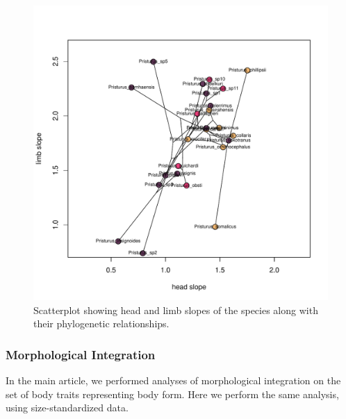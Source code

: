 \documentclass[
  11pt,
]{article}
\begin{document}
\begin{figure}[H]

{\centering \includegraphics[width=1\linewidth]{Figs/scatterplot_slopes} 

}

\caption{Scatterplot showing head and limb slopes of the species along with their phylogenetic relationships.}\label{fig:unnamed-chunk-7}
\end{figure}

\newpage

\hypertarget{morphological-integration}{%
\subsubsection{Morphological
Integration}\label{morphological-integration}}

In the main article, we performed analyses of morphological integration
on the set of body traits representing body form. Here we perform the
same analysis, using size-standardized data.
\end{document}
